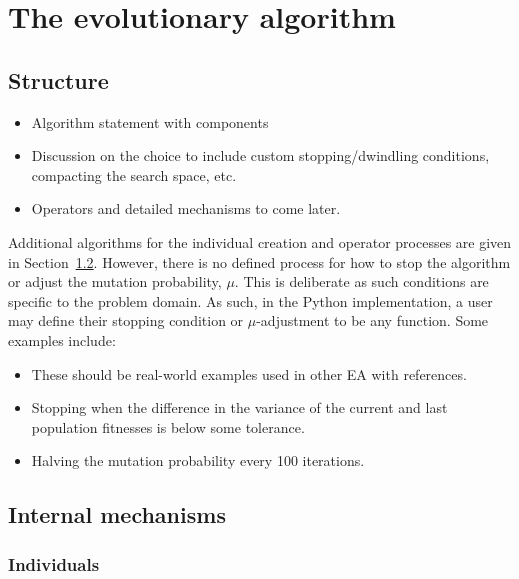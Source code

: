 \section{The evolutionary algorithm}\label{section:algorithm}

\subsection{Structure}

\begin{itemize}
    \item Algorithm statement with components
    \item Discussion on the choice to include custom stopping/dwindling
        conditions, compacting the search space, etc.
    \item Operators and detailed mechanisms to come later.
\end{itemize}






Additional algorithms for the individual creation and operator processes are
given in Section~\ref{subsection:mechanisms}. However, there is no defined
process for how to stop the algorithm or adjust the mutation probability,
\(\mu\). This is deliberate as such conditions are specific to the problem
domain. As such, in the Python implementation, a user may define their stopping
condition or \(\mu\)-adjustment to be any function. Some examples include:

\begin{itemize}
    \item These should be real-world examples used in other EA with references.
    \item Stopping when the difference in the variance of the current and last
        population fitnesses is below some tolerance.
    \item Halving the mutation probability every 100 iterations.
\end{itemize}
        

\subsection{Internal mechanisms}\label{subsection:mechanisms}

\subsubsection{Individuals}

